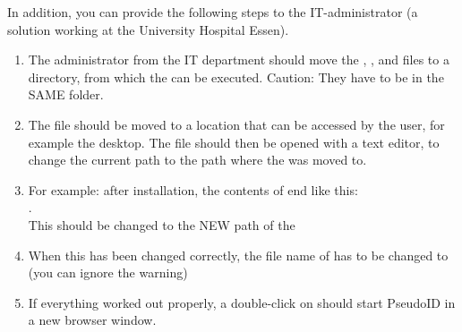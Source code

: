 In addition, you can provide the following steps to the IT-administrator (a solution working at the University Hospital Essen).

\begin{enumerate}
    
    \item The administrator from the IT department should move the , ,  and  files to a directory, from which the  can be executed. Caution: They have to be in the SAME folder. 
    
    \item The  file should be moved to a location that can be accessed by the user, for example the desktop. The file should then be opened with a text editor, to change the current path to the path where the  was moved to.
    \label{item:admin}
    
    \item For example: after installation, the contents of  end like this: \\ . \\ This should be changed to the NEW path of the 
    
    \item When this has been changed correctly, the file name of  has to be changed to  (you can ignore the warning)
    
    \item If everything worked out properly, a double-click on  should start PseudoID in a new browser window.
\end{enumerate} 


